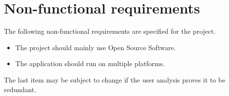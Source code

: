 \section*{Non-functional requirements}
The following non-functional requirements are specified for the project.

\begin{itemize}
	\item The project should mainly use Open Source Software.
	\item The application should run on multiple platforms.
\end{itemize}

The last item may be subject to change if the user analysis proves it to be redundant.
